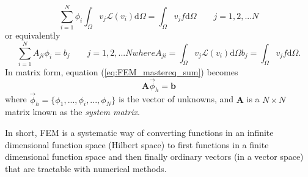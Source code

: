 \begin{equation}
    \sum_{i=1}^N\phi_i \int_\Omega v_j \mathcal{L} (v_i) \text{d}\Omega = \int_\Omega v_j f \text{d}\Omega \quad\quad j=1,2,...N
    \label{eq:FEM_mastereq_integral}
\end{equation}
or equivalently\cite{FEM_TheoryAndCompOfEM_Jian-Ming_Jin}
\begin{subequations}
\begin{equation}
    \sum_{i=1}^N A_{ji}\phi_i = b_j \quad\quad j=1,2,...N
\end{equation}
where
\begin{equation}
    A_{ji} = \int_\Omega v_j \mathcal{L}(v_i)\text{d}\Omega
    \label{eq:FEM_mastereq_sum_Aji_bj}    
\end{equation}
\begin{equation}
    b_j = \int_\Omega v_j f \text{d}\Omega.
\end{equation}
\label{eq:FEM_mastereq_sum}
\end{subequations} %
In matrix form, equation (\ref{eq:FEM_mastereq_sum}) becomes
\begin{equation}
    \mathbf{A}\vec{\phi}_h = \mathbf{b}
    \label{eq:FEM_mastereq_matrix}
\end{equation}
where $\vec{\phi}_h = \{\phi_1, ...,\phi_i, ..., \phi_N\}$ is the vector of unknowns, and $\mathbf{A}$ is a $N\times N$ matrix known as the \emph{system matrix}\cite{FEM_comsol}. 

In short, FEM is a systematic way of converting functions in an infinite dimensional function space (Hilbert space) to first functions in a finite dimensional function space and then finally ordinary vectors (in a vector space) that are tractable with numerical methods.

